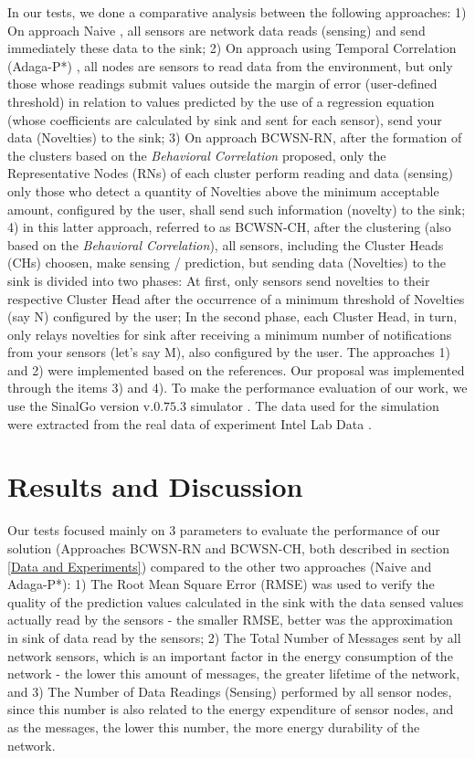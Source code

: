 \documentclass[conference]{IEEEtran}
\begin{document}
In our tests, we done a comparative analysis between the following approaches:
1) On approach Naive \cite{Madden2005}, all sensors are network data reads
(sensing) and send immediately these data to the sink; 2) On approach using
Temporal Correlation (Adaga-P*) \cite{MaiaSAC2013}, all nodes are sensors to
read data from the environment, but only those whose readings submit values
outside the margin of error (user-defined threshold) in relation to values
predicted by the use of a regression equation (whose coefficients are calculated
by sink and sent for each sensor), send your data (Novelties) to the sink; 3) On
approach BCWSN-RN, after the formation of the clusters based on the
\textit{Behavioral Correlation} proposed, only the Representative Nodes (RNs) of
each cluster perform reading and data (sensing) only those who detect a quantity
of Novelties above the minimum acceptable amount, configured by the user, shall
send such information (novelty) to the sink; 4) in this latter approach,
referred to as BCWSN-CH, after the clustering (also based on the
\textit{Behavioral Correlation}), all sensors, including the Cluster Heads (CHs)
choosen, make sensing / prediction, but sending data (Novelties) to the sink is
divided into two phases: At first, only sensors send novelties to their
respective Cluster Head after the occurrence of a minimum threshold of Novelties
(say N) configured by the user; In the second phase, each Cluster Head, in turn,
only relays novelties for sink after receiving a minimum number of notifications
from your sensors (let's say M), also configured by the user.
The approaches 1) and 2) were implemented based on the references. Our proposal
was implemented through the items 3) and 4).
To make the performance evaluation of our work, we use the SinalGo version
v.$0.75.3$ simulator \cite{Sinalgo2007}. The data used for the simulation were
extracted from the real data of experiment Intel Lab Data \cite{Intel2004}.

\section{Results and Discussion}

Our tests focused mainly on 3 parameters to evaluate the performance of our
solution (Approaches BCWSN-RN and BCWSN-CH, both described in section
\ref{Data and Experiments}) compared to the other two approaches (Naive and
Adaga-P*): 1) The Root Mean Square Error (RMSE) was used to verify the quality
of the prediction values calculated in the sink with the data sensed values
actually read by the sensors - the smaller RMSE, better was the approximation in
sink of data read by the sensors; 2) The Total Number of Messages sent by all
network sensors, which is an important factor in the energy consumption of the network -
the lower this amount of messages, the greater lifetime of the network, and 3)
The Number of Data Readings (Sensing) performed by all sensor nodes, since this
number is also related to the energy expenditure of sensor nodes, and as the
messages, the lower this number, the more energy durability of the network.
\end{document}
